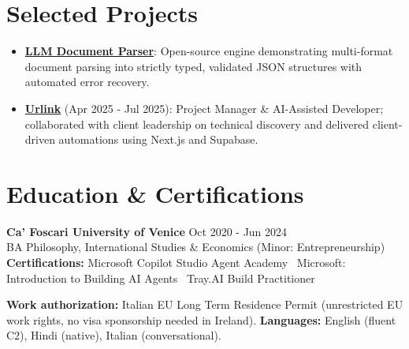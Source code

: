 \documentclass[a4paper,10pt]{article}
\begin{document}
\section{Selected Projects}
\begin{itemize}
  \item \textbf{\href{https://github.com/prab-gupta/llm-doc-parser}{LLM Document Parser}}: Open-source engine demonstrating multi-format document parsing into strictly typed, validated JSON structures with automated error recovery.
  \item \textbf{\href{https://smarturlink.com/}{Urlink}} (Apr 2025 - Jul 2025): Project Manager \& AI-Assisted Developer; collaborated with client leadership on technical discovery and delivered client-driven automations using Next.js and Supabase.
\end{itemize}

\section{Education \& Certifications}
\textbf{Ca' Foscari University of Venice} \hfill Oct 2020 - Jun 2024\\
BA Philosophy, International Studies \& Economics (Minor: Entrepreneurship)\\[1pt]
\textbf{Certifications:} Microsoft Copilot Studio Agent Academy \textbullet\ Microsoft: Introduction to Building AI Agents \textbullet\ Tray.AI Build Practitioner

\vspace{2pt}
{\small \textbf{Work authorization:} Italian EU Long Term Residence Permit (unrestricted EU work rights, no visa sponsorship needed in Ireland). \quad \textbf{Languages:} English (fluent C2), Hindi (native), Italian (conversational).}
\end{document}
